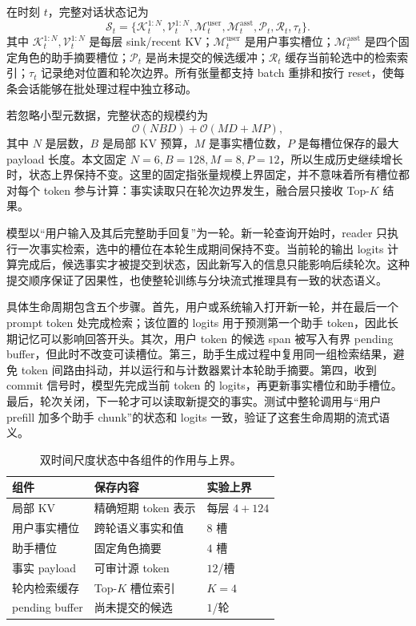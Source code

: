 \documentclass[letterpaper]{article}
\begin{document}
在时刻 $t$，完整对话状态记为
\begin{equation}
\mathcal{S}_t=\{\mathcal{K}^{1:N}_t,\mathcal{V}^{1:N}_t,
\mathcal{M}^{\mathrm{user}}_t,\mathcal{M}^{\mathrm{asst}}_t,
\mathcal{P}_t,\mathcal{R}_t,\tau_t\}.
\end{equation}
其中 $\mathcal{K}^{1:N}_t,\mathcal{V}^{1:N}_t$ 是每层 sink/recent KV；$\mathcal{M}^{\mathrm{user}}_t$ 是用户事实槽位；$\mathcal{M}^{\mathrm{asst}}_t$ 是四个固定角色的助手摘要槽位；$\mathcal{P}_t$ 是尚未提交的候选缓冲；$\mathcal{R}_t$ 缓存当前轮选中的检索索引；$\tau_t$ 记录绝对位置和轮次边界。所有张量都支持 batch 重排和按行 reset，使每条会话能够在批处理过程中独立移动。

若忽略小型元数据，完整状态的规模约为
\begin{equation}
\mathcal{O}(NBD)+\mathcal{O}(MD+MP),
\end{equation}
其中 $N$ 是层数，$B$ 是局部 KV 预算，$M$ 是事实槽位数，$P$ 是每槽位保存的最大 payload 长度。本文固定 $N=6,B=128,M=8,P=12$，所以生成历史继续增长时，状态上界保持不变。这里的固定指张量规模上界固定，并不意味着所有槽位都对每个 token 参与计算：事实读取只在轮次边界发生，融合层只接收 Top-$K$ 结果。

模型以“用户输入及其后完整助手回复”为一轮。新一轮查询开始时，reader 只执行一次事实检索，选中的槽位在本轮生成期间保持不变。当前轮的输出 logits 计算完成后，候选事实才被提交到状态，因此新写入的信息只能影响后续轮次。这种提交顺序保证了因果性，也使整轮训练与分块流式推理具有一致的状态语义。

具体生命周期包含五个步骤。首先，用户或系统输入打开新一轮，并在最后一个 prompt token 处完成检索；该位置的 logits 用于预测第一个助手 token，因此长期记忆可以影响回答开头。其次，用户 token 的候选 span 被写入有界 pending buffer，但此时不改变可读槽位。第三，助手生成过程中复用同一组检索结果，避免 token 间路由抖动，并以运行和与计数器累计本轮助手摘要。第四，收到 commit 信号时，模型先完成当前 token 的 logits，再更新事实槽位和助手槽位。最后，轮次关闭，下一轮才可以读取新提交的事实。测试中整轮调用与“用户 prefill 加多个助手 chunk”的状态和 logits 一致，验证了这套生命周期的流式语义。

\begin{table}[t]
\centering
\caption{双时间尺度状态中各组件的作用与上界。}
\label{tab:state-components}
\begin{tabular}{lll}
\toprule
组件 & 保存内容 & 实验上界\\
\midrule
局部 KV & 精确短期 token 表示 & 每层 $4+124$\\
用户事实槽位 & 跨轮语义事实和值 & $8$ 槽\\
助手槽位 & 固定角色摘要 & $4$ 槽\\
事实 payload & 可审计源 token & $12$/槽\\
轮内检索缓存 & Top-$K$ 槽位索引 & $K=4$\\
pending buffer & 尚未提交的候选 & $1$/轮\\
\bottomrule
\end{tabular}
\end{table}
\end{document}
